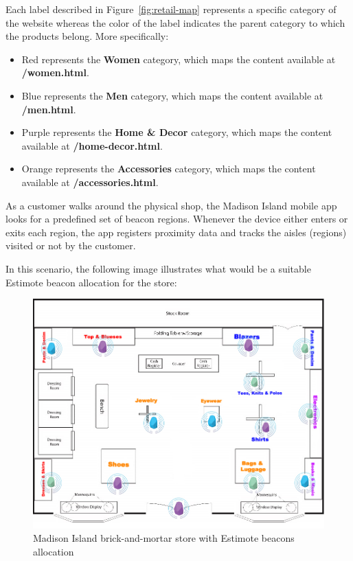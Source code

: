 Each label described in Figure~\ref{fig:retail-map} represents a specific category of the website whereas the color of the label indicates the parent category to which the products belong. More specifically:

\begin{itemize}
  \item Red represents the \textbf{Women} category, which maps the content available at \textbf{/women.html}. 
  \item Blue represents the \textbf{Men} category, which maps the content available at \textbf{/men.html}.
  \item Purple represents the \textbf{Home \& Decor} category, which maps the content available at \textbf{/home-decor.html}. 
  \item Orange represents the \textbf{Accessories} category, which maps the content available at \textbf{/accessories.html}. 
\end{itemize}

As a customer walks around the physical shop, the Madison Island mobile app looks for a predefined set of beacon regions. Whenever the device either enters or exits each region, the app registers proximity data and tracks the aisles (regions) visited or not by the customer.

In this scenario, the following image illustrates what would be a suitable Estimote beacon allocation for the store:

\vspace{0.5cm}
\begin{figure}[H]
  \centering
    \includegraphics[width=16cm]{images/madison/retail-map-beacon.jpg}
  \caption{Madison Island brick-and-mortar store with Estimote beacons allocation}
  \label{fig:beacons-map}
\end{figure}
\vspace{0.5cm}

